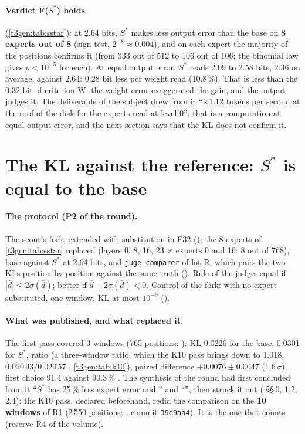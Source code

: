 \paragraph{Verdict F($S^{*}$) holds} (\cref{t3gen:tab:sstar}): at 2.64 bits, $S^{*}$ makes less output error than the base on \textbf{8 experts out of 8} (sign test, $2^{-8} \approx 0.004$), and on each expert the majority of the positions confirms it (from 333 out of 512 to 106 out of 106; the binomial law gives $p < 10^{-5}$ for each). At equal output error, $S^{*}$ reads 2.09 to 2.58 bits, 2.36 on average, against 2.64: 0.28 bit less per weight read (10.8\,\%). That is less than the 0.32 bit of criterion W: the weight error exaggerated the gain, and the output judges it. The deliverable of the subject drew from it ``$\times 1.12$ tokens per second at the roof of the disk for the experts read at level 0''; that is a computation at equal output error, and the next section says that the KL does not confirm it.

\section{The KL against the reference: \texorpdfstring{$S^{*}$}{S*} is equal to the base}\label{t3gen:sec:kl}

\paragraph{The protocol (P2 of the round).} The scout's fork, extended with substitution in F32 (); the 8 experts of \cref{t3gen:tab:sstar} replaced (layers 0, 8, 16, 23 $\times$ experts 0 and 16: 8 out of 768), base against $S^{*}$ at 2.64 bits, and \texttt{juge comparer} of lot R, which pairs the two KLs position by position against the same truth (). Rule of the judge: equal if $|\bar d| \le 2\sigma(\bar d)$; better if $\bar d + 2\sigma(\bar d) < 0$. Control of the fork: with no expert substituted, one window, KL at most $10^{-9}$ ().

\paragraph{What was published, and what replaced it.} The first pass covered 3 windows (765 positions; ): KL 0.0226 for the base, 0.0301 for $S^{*}$, ratio  (a three-window ratio, which the K10 pass brings down to 1.018, $0.020\,93/0.020\,57$ \calc, \cref{t3gen:tab:k10}), paired difference $+0.0076 \pm 0.0047$ (1.6\,$\sigma$), first choice 91.4 against 90.3\,\% \mes. The synthesis of the round had first concluded from it ``$S^{*}$ has 25\,\% less expert error and '' and ``'', then struck it out ( §§\,0, 1.2, 2.4): the K10 pass, declared beforehand, redid the comparison on the \textbf{10 windows} of R1 (2\,550 positions; , commit \texttt{39e9aa4}). It is the one that counts (reserve R4 of the volume).

